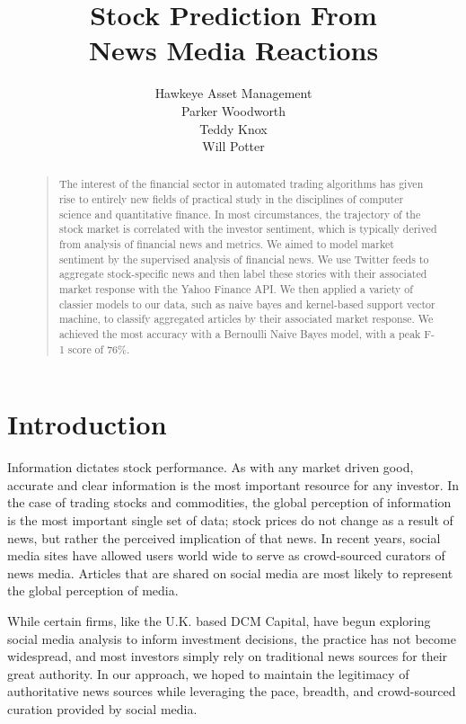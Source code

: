 \documentclass[letterpaper]{article}
\begin{document}
\title{Stock Prediction From\\ News Media Reactions}
\author{Hawkeye Asset Management\\
Parker Woodworth\\
Teddy Knox\\
Will Potter\\
}
\maketitle
\begin{abstract}
\begin{quote}
The interest of the financial sector in automated trading algorithms has given rise to entirely new fields of practical study in the disciplines of computer science and quantitative finance. In most circumstances, the trajectory of the stock market is correlated with the investor sentiment, which is typically derived from analysis of financial news and metrics. We aimed to model market sentiment by the supervised analysis of financial news. We use Twitter feeds to aggregate stock-specific news and then label these stories with their associated market response with the Yahoo Finance API. We then applied a variety of classier models to our data, such as naive bayes and kernel-based support vector machine, to classify aggregated articles by their associated market response. We achieved the most accuracy with a Bernoulli Naive Bayes model, with a peak F-1 score of 76\%.
\end{quote}
\end{abstract}

\section{Introduction}
\noindent Information dictates stock performance. As with any market driven good, accurate and clear information is the most important resource for any investor. In the case of trading stocks and commodities, the global perception of information is the most important single set of data; stock prices do not change as a result of news, but rather the perceived implication of that news. In recent years, social media sites have allowed users world wide to serve as crowd-sourced curators of news media. Articles that are shared on social media are most likely to represent the global perception of media.

While certain firms, like the U.K. based DCM Capital, have begun exploring social media analysis to inform investment decisions, the practice has not become widespread, and most investors simply rely on traditional news sources for their great authority. In our approach, we hoped to maintain the legitimacy of authoritative news sources while leveraging the pace, breadth, and crowd-sourced curation provided by social media.
\end{document}
